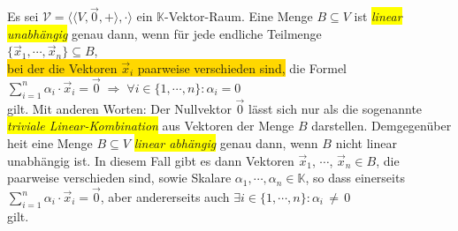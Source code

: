 \begin{Definition} \lb
Es sei $\mathcal{V} = \bigl\langle \langle V, \vec{0}, + \rangle, \cdot \bigr\rangle$ ein $\mathbb{K}$-Vektor-Raum.  
Eine Menge $B \subseteq V$ ist \colorbox{yellow}{\emph{linear unabh\"{a}ngig}} genau dann, wenn 
f\"{u}r jede endliche Teilmenge
\\[0.2cm]
\hspace*{1.3cm}
$\bigl\{ \vec{x}_1, \cdots, \vec{x}_n \bigr\} \subseteq B$,
\\[0.2cm]
\colorbox{gold}{bei der die Vektoren $\vec{x}_i$ paarweise verschieden sind,} die Formel
\\[0.2cm]
\hspace*{1.3cm}
$\sum\limits_{i=1}^n \alpha_i \cdot \vec{x}_i = \vec{0} \;\Rightarrow\; \forall i \in \{1,\cdots,n\}: \alpha_i = 0$
\\[0.2cm]
gilt.  Mit anderen Worten:  Der Nullvektor $\vec{0}$ l\"{a}sst sich nur als die sogenannte
\colorbox{yellow}{\emph{triviale Linear-Kombination}} aus Vektoren der Menge $B$ darstellen.  Demgegen\"{u}ber hei\3t eine
Menge $B \subseteq V$ \colorbox{yellow}{\emph{linear abh\"{a}ngig}} genau dann, wenn $B$ nicht linear unabh\"{a}ngig ist.  In
diesem Fall gibt es dann Vektoren $\vec{x}_1$, $\cdots$, $\vec{x}_n \in B$, die paarweise
verschieden sind, sowie Skalare $\alpha_1,\cdots,\alpha_n \in \mathbb{K}$, so dass einerseits
\\[0.2cm]
\hspace*{1.3cm}
$\sum\limits_{i=1}^n \alpha_i \cdot \vec{x}_i = \vec{0}$, \quad aber andererseits auch \quad
$\exists i \in \{1,\cdots,n\}: \alpha_i \,\not=\, 0$
\\[0.2cm]
gilt.  
\eoxs
\end{Definition}

